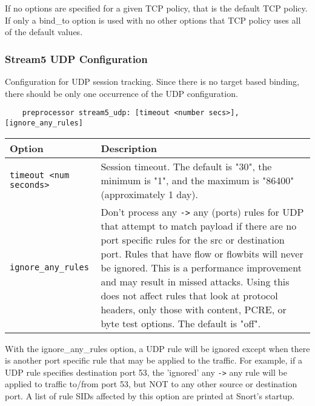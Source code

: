 \documentclass[english]{report}
\newenvironment{note}{
\samepage
    \vspace{10pt}{\textsf{
        {\hspace{7pt}\Huge{$\triangle$\hspace{-12.5pt}{\Large{$^!$}}}}\hspace{5pt}
        {\Large{NOTE}}
    }
    }
   \begin{center}
    \par\vspace{-17pt}

    \begin{lrbox}{\savepar}
    \begin{minipage}[r]{6in}
}
{
    \end{minipage}
    \end{lrbox}
    \fbox{
        \usebox{
            \savepar
	}
    }
    \par\vskip10pt
    \end{center}
}
\newenvironment{note}{
        \begin{rawhtml}
        <p><table border="1"><tr><td><b>
        Note:&nbsp;&nbsp;</b>
        \end{rawhtml}
}{
        \begin{rawhtml}
        </b></td></tr></table></p>
        \end{rawhtml}
}
\begin{document}
\begin{note}

If no options are specified for a given TCP policy, that is the default TCP
policy.  If only a bind\_to option is used with no other options that TCP
policy uses all of the default values.

\end{note}

\subsubsection{Stream5 UDP Configuration}

Configuration for UDP session tracking.  Since there is no target based
binding, there should be only one occurrence of the UDP configuration.

\begin{verbatim}
    preprocessor stream5_udp: [timeout <number secs>], [ignore_any_rules]
\end{verbatim}

\begin{center}
\begin{tabular}{| l | p{4.5in} |}

\hline
\textbf{Option} & \textbf{Description}\\
\hline 

\hline 
\texttt{timeout <num seconds>} &

Session timeout.  The default is "30", the minimum is "1", and the maximum is
"86400" (approximately 1 day).\\

\hline
\texttt{ignore\_any\_rules} &

Don't process any \texttt{->} any (ports) rules for UDP that attempt to match
payload if there are no port specific rules for the src or destination port.
Rules that have flow or flowbits will never be ignored.  This is a performance
improvement and may result in missed attacks.  Using this does not affect rules
that look at protocol headers, only those with content, PCRE, or byte test
options.  The default is "off".\\

\hline
\end{tabular}
\end{center}

\begin{note}

With the ignore\_any\_rules option, a UDP rule will be ignored except when
there is another port specific rule that may be applied to the traffic.  For
example, if a UDP rule specifies destination port 53, the 'ignored' any
\texttt{->} any rule will be applied to traffic to/from port 53, but NOT to any
other source or destination port.  A list of rule SIDs affected by this option
are printed at Snort's startup.

\end{note}
\end{document}
